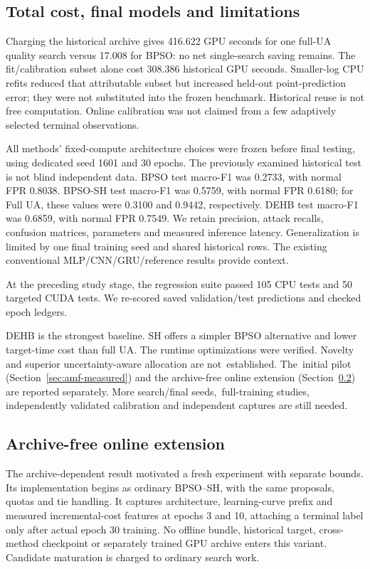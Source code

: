 \subsection{Total cost, final models and limitations}
Charging the historical archive gives 416.622 GPU seconds for one full-UA quality search versus 17.008 for BPSO: no net single-search saving remains. The fit/calibration subset alone cost 308.386 historical GPU seconds. Smaller-log CPU refits reduced that attributable subset but increased held-out point-prediction error; they were not substituted into the frozen benchmark. Historical reuse is not free computation. Online calibration was not claimed from a few adaptively selected terminal observations.

All methods' fixed-compute architecture choices were frozen before final testing, using dedicated seed 1601 and 30 epochs. The previously examined historical test is not blind independent data. BPSO test macro-F1 was 0.2733, with normal FPR 0.8038. BPSO-SH test macro-F1 was 0.5759, with normal FPR 0.6180; for Full UA, these values were 0.3100 and 0.9442, respectively. DEHB test macro-F1 was 0.6859, with normal FPR 0.7549. We retain precision, attack recalls, confusion matrices, parameters and measured inference latency. Generalization is limited by one final training seed and shared historical rows. The existing conventional MLP/CNN/GRU/reference results provide context.

At the preceding study stage, the regression suite passed 105 CPU tests and 50 targeted CUDA tests. We re-scored saved validation/test predictions and checked epoch ledgers.

DEHB is the strongest baseline. SH offers a simpler BPSO alternative and lower target-time cost than full UA. The runtime optimizations were verified. Novelty and superior uncertainty-aware allocation are \mbox{not established.} The~initial pilot (Section~\ref{sec:amf-measured}) and the archive-free online extension (Section~\ref{sec:amf-online}) are reported separately. More search/final \mbox{seeds, full-training} studies, independently validated calibration and independent captures are still needed.

\subsection{Archive-free online extension}
\label{sec:amf-online}
The archive-dependent result motivated a fresh experiment with separate bounds. Its implementation begins as ordinary BPSO--SH, with the same proposals, quotas and tie handling. It captures architecture, learning-curve prefix and measured incremental-cost features at epochs 3 and 10, attaching a terminal label only after actual epoch 30 training. No offline bundle, historical target, cross-method checkpoint or separately trained GPU archive enters this variant. Candidate maturation is charged to ordinary search work.


